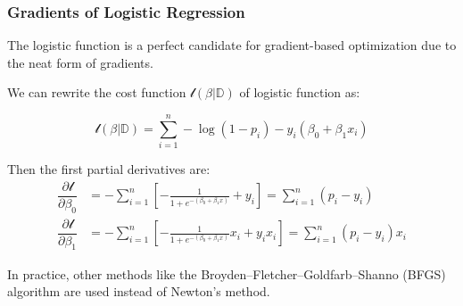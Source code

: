 \documentclass[10pt,aspectratio=169]{beamer}
\begin{document}
      \begin{frame}
        \frametitle{Gradients of Logistic Regression}
%
        The logistic function is a
        perfect candidate for gradient-based optimization due to the
        neat form of gradients.

        \vfill We can rewrite the cost function
        $\mathscr{l}(\beta|\mathbb{D})$ of logistic function as:

        \begin{equation*}
          \mathscr{l}(\beta|\mathbb{D}) = \sum_{i=1}^{n}  -\log (1 - p_{i}) - y_{i} (\beta_{0} + \beta_{1}x_{i})
        \end{equation*}

        Then the first partial derivatives are:
        \begin{align*}
          \dfrac{\partial \mathscr{l}}{\partial \beta_{0}}
          &= -\sum_{i=1}^{n} \left[ -\frac{1}{1 + e^{-(\beta_{0} + \beta_{1} x)}} + y_{i} \right] = \sum_{i=1}^{n} (p_{i} - y_{i})\\
          \dfrac{\partial \mathscr{l}}{\partial \beta_{1}}
          &= -\sum_{i=1}^{n} \left[ -\frac{1}{1 + e^{-(\beta_{0} + \beta_{1} x)}}x_{i} + y_{i}x_{i} \right]= \sum_{i=1}^{n} (p_{i} - y_{i})x_{i}
        \end{align*}
        
        \vfill In practice, other methods like the
        Broyden–Fletcher–Goldfarb–Shanno (BFGS) algorithm are used
        instead of Newton's method.

        
      \end{frame}
\end{document}
